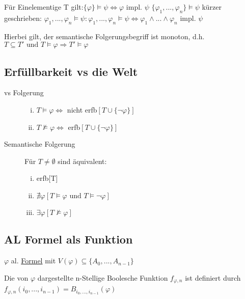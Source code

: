 \documentclass[12pt,a4paper]{article} %
\begin{document}
	Für Einelementige T gilt:$\{\varphi\} \hyperref[Erfullbar]{\vDash} \psi \Leftrightarrow \varphi$ impl. $\psi$ \newline
	$\{\varphi_1, ..., \varphi_n\} \hyperref[Erfullbar]{\vDash} \psi$ kürzer geschrieben: \newline $\varphi_1, ..., \varphi_n \hyperref[Erfullbar]{\vDash} \psi: \varphi_1, ..., \varphi_n \hyperref[Erfullbar]{\vDash} \psi \Leftrightarrow \varphi_1 \land ... \land \varphi_n$ impl. $\psi$
	
	Hierbei gilt, der semantische Folgerungsbegriff ist monoton, d.h. \newline
	$T \subseteq T'\text{ und } T \hyperref[Erfullbar]{\vDash} \varphi \Rightarrow T' \hyperref[Erfullbar]{\vDash} \varphi$
	
	\subsection{Erfüllbarkeit vs die Welt}
	\begin{description}
		\item[vs Folgerung] \begin{enumerate}[(i)]
			\item $T \hyperref[Erfullbar]{\vDash} \varphi \Leftrightarrow$ nicht erfb$[T \cup \{\neg \varphi\}]$ \newline
			\item $T \nvDash \varphi \Leftrightarrow$ erfb$[T \cup \{\neg \varphi\}]$
		\end{enumerate}
		\item[Semantische Folgerung] Für $T \ne \emptyset$ sind äquivalent:
		\begin{enumerate}[(i)]
			\item erfb[T]
			\item $\nexists \varphi[T \hyperref[Erfullbar]{\vDash} \varphi \text{ und } T \hyperref[Erfullbar]{\vDash} \neg \varphi]$
			\item $\exists \varphi [T \nvDash \varphi]$
		\end{enumerate}
	\end{description}
	
	\subsection{AL Formel als Funktion}
	$\varphi$ al. \hyperref[Formel]{Formel} mit $V(\varphi) \subseteq \{A_0, ..., A_{n - 1}\}$
	
	Die von $\varphi$ dargestellte n-Stellige Boolesche Funktion $f_{\varphi, n}$ ist definiert durch $f_{\varphi, n}(i_0, ..., i_{n-1}) = \widehat{B}_{i_0, ..., i_{n - 1}}(\varphi)$
	
\end{document}
